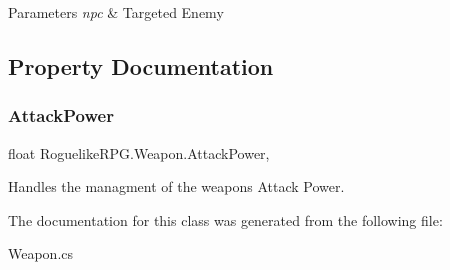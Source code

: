 \begin{DoxyParams}{Parameters}
{\em npc} & Targeted Enemy\\
\hline
\end{DoxyParams}


\subsection{Property Documentation}
\mbox{\label{class_roguelike_r_p_g_1_1_weapon_a68ffbf4b9ebe1e99d879c18021dba80b}} 
\subsubsection{\texorpdfstring{Attack\+Power}{AttackPower}}
{\footnotesize\ttfamily float Roguelike\+R\+P\+G.\+Weapon.\+Attack\+Power\hspace{0.3cm}{\ttfamily [get]}, {\ttfamily [set]}}



Handles the managment of the weapon\textquotesingle{}s Attack Power. 



The documentation for this class was generated from the following file\+:\begin{DoxyCompactItemize}
\item 
Weapon.\+cs\end{DoxyCompactItemize}
